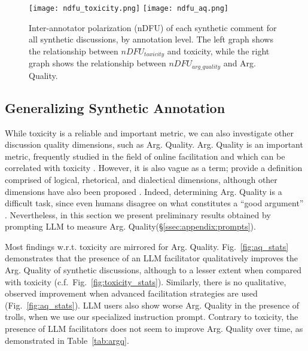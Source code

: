 \begin{figure}[t]
	\texttt{[image: ndfu\_toxicity.png]} \hfill
	\texttt{[image: ndfu\_aq.png]}
	\centering
	\caption{Inter-annotator polarization (nDFU) of each synthetic comment for all synthetic discussions, by annotation level. The left graph shows the relationship between $nDFU_{toxicity}$ and toxicity, while the right graph shows the relationship between $nDFU_{arg\_quality}$ and Arg. Quality.}
	\label{fig:ndfu_annot}
\end{figure}

\subsection{Generalizing Synthetic Annotation}

While toxicity is a reliable and important metric, we can also investigate other discussion quality dimensions, such as Arg. Quality. Arg. Quality is an important metric, frequently studied in the field of online facilitation \cite{argyle2023, schroeder-etal-2024-fora, falk-etal-2024-moderation, falk-etal-2021-predicting} and which can be correlated with toxicity \cite{chang-danescu-niculescu-mizil-2019-trouble}. However, it is also vague as a term; \citet{wachsmuth-etal-2017-computational} provide a definition comprised of logical, rhetorical, and dialectical dimensions, although other dimensions have also been proposed \cite{habernal-gurevych-2016-argument, persing-ng-2015-modeling}. Indeed, determining Arg. Quality is a difficult task, since even humans disagree on what constitutes a ``good argument” \cite{wachsmuth-etal-2017-computational, argyle2023}. Nevertheless, in this section we present preliminary results obtained by prompting LLM to measure Arg. Quality(\S\ref{ssec:appendix:prompts}). 

Most findings w.r.t. toxicity are mirrored for Arg. Quality. Fig.~\ref{fig:aq_stats} demonstrates that the presence of an LLM facilitator qualitatively improves the Arg. Quality of synthetic discussions, although to a lesser extent when compared with toxicity (c.f.\  Fig.~\ref{fig:toxicity_stats}). Similarly, there is no qualitative, observed improvement when advanced facilitation strategies are used (Fig.~\ref{fig:aq_stats}). LLM users also show worse Arg. Quality in the presence of trolls, when we use our specialized instruction prompt. Contrary to toxicity, the presence of LLM facilitators does not seem to improve Arg. Quality over time, as demonstrated in Table~\ref{tab:argq}.

